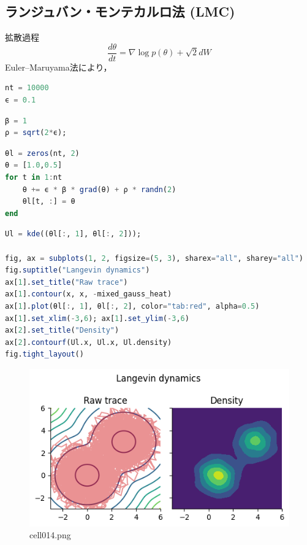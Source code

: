 \subsection{ランジュバン・モンテカルロ法 (LMC)}
拡散過程
\begin{equation}
{\frac{d\theta}{dt}}=\nabla \log p (\theta)+{\sqrt 2}{d{W}}
\end{equation}
Euler–Maruyama法により，
\begin{lstlisting}[language=julia]
nt = 10000
ϵ = 0.1
\end{lstlisting}
\begin{lstlisting}[language=julia]
β = 1
ρ = sqrt(2*ϵ);
\end{lstlisting}
\begin{lstlisting}[language=julia]
θl = zeros(nt, 2)
θ = [1.0,0.5]
for t in 1:nt
    θ += ϵ * β * grad(θ) + ρ * randn(2)
    θl[t, :] = θ
end
\end{lstlisting}
\begin{lstlisting}[language=julia]
Ul = kde((θl[:, 1], θl[:, 2]));

fig, ax = subplots(1, 2, figsize=(5, 3), sharex="all", sharey="all")
fig.suptitle("Langevin dynamics")
ax[1].set_title("Raw trace")
ax[1].contour(x, x, -mixed_gauss_heat)
ax[1].plot(θl[:, 1], θl[:, 2], color="tab:red", alpha=0.5)
ax[1].set_xlim(-3,6); ax[1].set_ylim(-3,6)
ax[2].set_title("Density")
ax[2].contourf(Ul.x, Ul.x, Ul.density)
fig.tight_layout()
\end{lstlisting}
\begin{figure}[ht]
	\centering
	\includegraphics[scale=0.8, max width=\linewidth]{./fig/bayesian-brain/mcmc/cell014.png}
	\caption{cell014.png}
	\label{cell014.png}
\end{figure}
